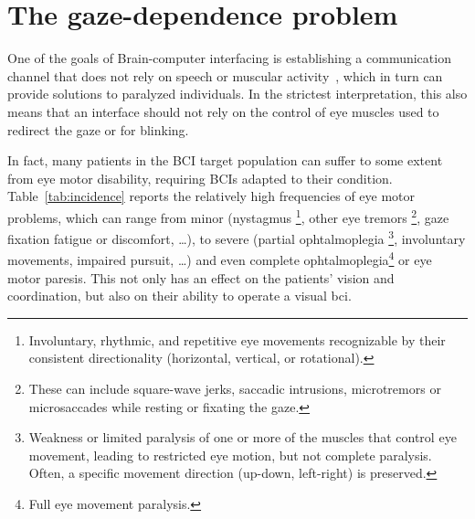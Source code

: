 
\section{The gaze-dependence problem}



One of the goals of Brain-computer interfacing is establishing a communication
channel that does not rely on speech or muscular activity~\cite{Naci2012,Chaudhary2016},
which in turn can provide solutions to paralyzed individuals.
In the strictest interpretation, this also means that an interface should not
rely on the control of eye muscles used to redirect the gaze or for blinking.

In fact, many patients in the BCI target population can suffer to some extent
from eye motor disability, requiring BCIs adapted to their condition.
Table~\ref{tab:incidence} reports the relatively high frequencies of
eye motor problems, which can range from minor (nystagmus
\footnote{
Involuntary, rhythmic, and repetitive eye movements recognizable by their
consistent directionality (horizontal, vertical, or rotational).
}, other eye tremors
\footnote{
These can include square-wave jerks, saccadic intrusions, microtremors or
microsaccades while resting or fixating the gaze.
}, gaze fixation fatigue or discomfort, \ldots), to severe (partial ophtalmoplegia
\footnote{
Weakness or limited paralysis of one or more of the muscles that control eye
movement, leading to restricted eye motion, but not complete paralysis.
Often, a specific movement direction (up-down, left-right) is preserved.
}, involuntary movements, impaired pursuit, \ldots) and even complete
ophtalmoplegia\footnote{Full eye movement paralysis.} or eye motor paresis.
This not only has an effect on the patients' vision and coordination, but also
on their ability to operate a visual \ac{bci}.

